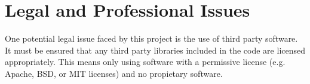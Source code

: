 \section{Legal and Professional Issues}
\label{section:professional_issues}

One potential legal issue faced by this project is the use of third party software.
It must be ensured that any third party libraries included in the code are licensed
appropriately. This means only using software with a permissive license (e.g. Apache,
BSD, or MIT licenses) and no propietary software.

